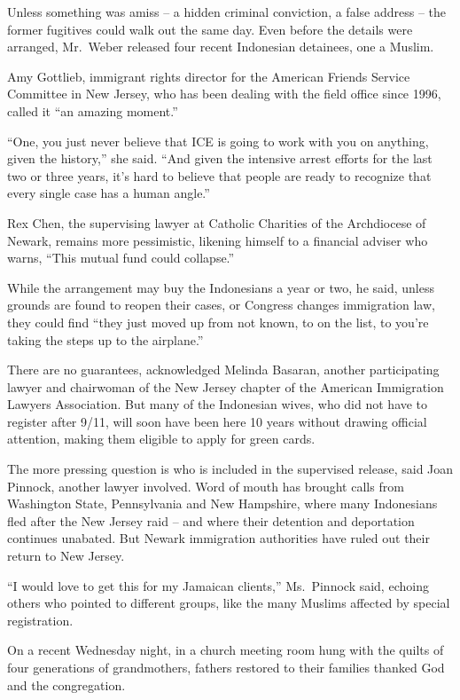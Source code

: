 ﻿\documentclass[12pt]{article}
\begin{document}
Unless something was amiss -- a hidden criminal conviction, a false address -- the former fugitives
could walk out the same day. Even before the details were arranged, Mr.~Weber released four recent
Indonesian detainees, one a Muslim.

Amy Gottlieb, immigrant rights director for the American Friends Service Committee in New Jersey,
who has been dealing with the field office since 1996, called it ``an amazing moment.''

``One, you just never believe that ICE is going to work with you on anything, given the history,''
she said. ``And given the intensive arrest efforts for the last two or three years, it's hard to
believe that people are ready to recognize that every single case has a human angle.''

Rex Chen, the supervising lawyer at Catholic Charities of the Archdiocese of Newark, remains more
pessimistic, likening himself to a financial adviser who warns, ``This mutual fund could collapse.''

While the arrangement may buy the Indonesians a year or two, he said, unless grounds are found to
reopen their cases, or Congress changes immigration law, they could find ``they just moved up from
not known, to on the list, to you're taking the steps up to the airplane.''

There are no guarantees, acknowledged Melinda Basaran, another participating lawyer and chairwoman
of the New Jersey chapter of the American Immigration Lawyers Association. But many of the
Indonesian wives, who did not have to register after 9/11, will soon have been here 10 years without
drawing official attention, making them eligible to apply for green cards.

The more pressing question is who is included in the supervised release, said Joan Pinnock, another
lawyer involved. Word of mouth has brought calls from Washington State, Pennsylvania and New
Hampshire, where many Indonesians fled after the New Jersey raid -- and where their detention and
deportation continues unabated. But Newark immigration authorities have ruled out their return to
New Jersey.

``I would love to get this for my Jamaican clients,'' Ms.~Pinnock said, echoing others who pointed
to different groups, like the many Muslims affected by special registration.

On a recent Wednesday night, in a church meeting room hung with the quilts of four generations of
grandmothers, fathers restored to their families thanked God and the congregation.
\end{document}
